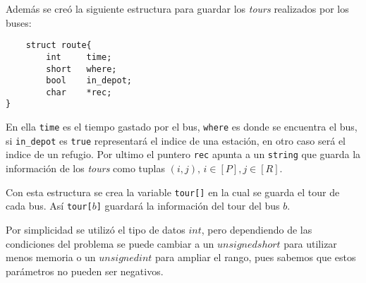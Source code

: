 \documentclass[letter, 10pt]{article}
\begin{document}
    Además se creó la siguiente estructura para guardar los \emph{tours}
    realizados por los buses:
    \begin{verbatim}
    struct route{
        int     time;
        short   where;
        bool    in_depot;
        char    *rec;
}
    \end{verbatim}
    En ella \texttt{time} es el tiempo gastado por el bus, \texttt{where} es
    donde se encuentra el bus, si \texttt{in\_depot} es \texttt{true}
    representará el indice de una estación, en otro caso será el indice de un
    refugio. Por ultimo el puntero \texttt{rec} apunta a un \texttt{string} que
    guarda la información de los \emph{tours} como tuplas 
    $(i,j),\,i\in[P],j\in[R]$.

    Con esta estructura se crea la variable \texttt{tour[]} en la cual se
    guarda el tour de cada bus. Así \texttt{tour[$b$]} guardará la información
    del tour del bus $b$.

    Por simplicidad se utilizó el tipo de datos $int$, pero
    dependiendo de las condiciones del problema se puede cambiar a un $unsigned
    short$ para utilizar menos memoria o un $unsigned int$ para ampliar el
    rango, pues sabemos que estos parámetros no pueden ser negativos.
\end{document}
